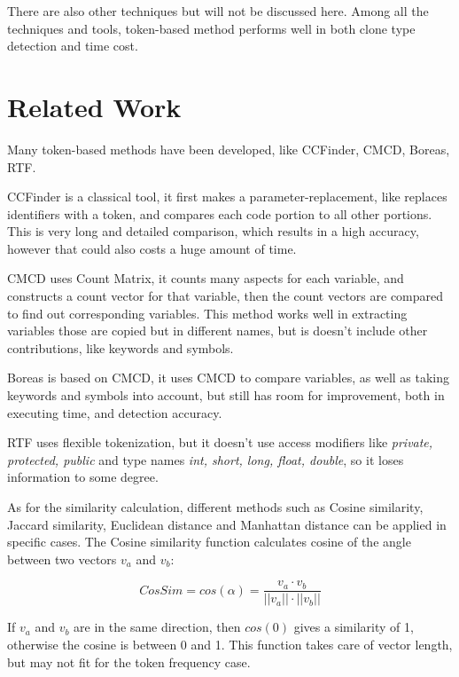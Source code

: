 \documentclass[conference]{IEEEtran}
\begin{document}
There are also other techniques but will not be discussed here.
Among all the techniques and tools, token-based method performs well in both clone type detection and time cost.

\section{Related Work}

Many token-based methods have been developed, like CCFinder\cite{CCFinder}, CMCD\cite{CMCD},  Boreas\cite{Boreas}, RTF\cite{RTF}. 

CCFinder is a classical tool, it first makes a parameter-replacement, like replaces identifiers with a token, and compares each code portion to all other portions. This is very long and detailed comparison, which results in a high accuracy, however that could also costs a huge amount of time.

CMCD uses Count Matrix, it counts many aspects for each variable, and constructs a count vector for that variable, then the count vectors are compared to find out corresponding variables. This method works well in extracting variables those are copied but in different names, but is doesn't include other contributions, like keywords and symbols.

Boreas is based on CMCD, it uses CMCD to compare variables, as well as taking keywords and symbols into account, but still has room for improvement, both in executing time, and detection accuracy. 

RTF uses flexible tokenization, but it doesn't use access modifiers like \emph{private, protected, public} and type names \emph{int, short, long, float, double}, so it loses information to some degree.

As for the similarity calculation, different methods such as Cosine similarity, Jaccard similarity, Euclidean distance and Manhattan distance can be applied in specific cases.
The Cosine similarity function calculates cosine of the angle between two vectors $v_a$ and $v_b$:

\begin{equation}
CosSim = cos(\alpha) = \frac{v_a \cdot v_b}{||v_a|| \cdot ||v_b||} \nonumber
\end{equation}

If $v_a$ and $v_b$ are in the same direction, then $cos(0)$ gives a similarity of 1, otherwise the cosine is between 0 and 1. This function takes care of vector length, but may not fit for the token frequency case. 
\end{document}
